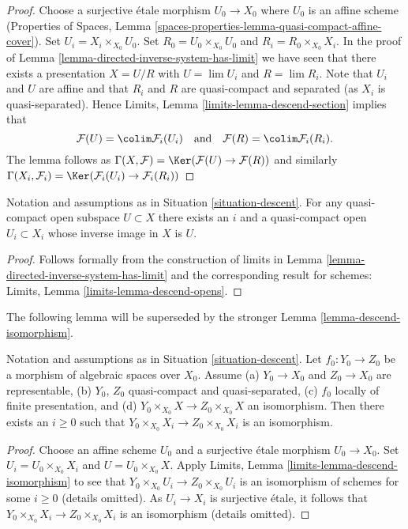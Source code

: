 \begin{proof}
Choose a surjective \'etale morphism $U_0 \to X_0$ where $U_0$ is an affine
scheme (Properties of Spaces, Lemma
\ref{spaces-properties-lemma-quasi-compact-affine-cover}).
Set $U_i = X_i \times_{X_0} U_0$.
Set $R_0 = U_0 \times_{X_0} U_0$ and $R_i = R_0 \times_{X_0} X_i$.
In the proof of Lemma \ref{lemma-directed-inverse-system-has-limit} we have
seen that there exists a presentation $X = U/R$ with
$U = \lim U_i$ and $R = \lim R_i$.
Note that $U_i$ and $U$ are affine and that $R_i$ and $R$ are
quasi-compact and separated (as $X_i$ is quasi-separated). Hence
Limits, Lemma \ref{limits-lemma-descend-section}
implies that
$$
\mathcal{F}(U) = \colim \mathcal{F}_i(U_i)
\quad\text{and}\quad
\mathcal{F}(R) = \colim \mathcal{F}_i(R_i).
$$
The lemma follows as
$\Gamma(X, \mathcal{F}) = \Ker(\mathcal{F}(U) \to \mathcal{F}(R))$
and similarly
$\Gamma(X_i, \mathcal{F}_i) =
\Ker(\mathcal{F}_i(U_i) \to \mathcal{F}_i(R_i))$
\end{proof}

\begin{lemma}
\label{lemma-descend-opens}
Notation and assumptions as in Situation \ref{situation-descent}.
For any quasi-compact open subspace $U \subset X$ there exists an $i$
and a quasi-compact open $U_i \subset X_i$ whose inverse image in $X$ is $U$.
\end{lemma}

\begin{proof}
Follows formally from the construction of limits in
Lemma \ref{lemma-directed-inverse-system-has-limit}
and the corresponding result for schemes:
Limits, Lemma \ref{limits-lemma-descend-opens}.
\end{proof}

\noindent
The following lemma will be superseded by the stronger
Lemma \ref{lemma-descend-isomorphism}.

\begin{lemma}
\label{lemma-descend-equality}
Notation and assumptions as in Situation \ref{situation-descent}.
Let $f_0 : Y_0 \to Z_0$ be a morphism of algebraic spaces over $X_0$.
Assume (a) $Y_0 \to X_0$ and $Z_0 \to X_0$ are representable, (b)
$Y_0$, $Z_0$ quasi-compact and quasi-separated, (c)
$f_0$ locally of finite presentation, and
(d) $Y_0 \times_{X_0} X \to Z_0 \times_{X_0} X$ an isomorphism.
Then there exists an $i \geq 0$ such that
$Y_0 \times_{X_0} X_i \to Z_0 \times_{X_0} X_i$ is an isomorphism.
\end{lemma}

\begin{proof}
Choose an affine scheme $U_0$ and a surjective \'etale morphism $U_0 \to X_0$.
Set $U_i = U_0 \times_{X_0} X_i$ and $U = U_0 \times_{X_0} X$.
Apply Limits, Lemma \ref{limits-lemma-descend-isomorphism}
to see that $Y_0 \times_{X_0} U_i \to Z_0 \times_{X_0} U_i$
is an isomorphism of schemes for some $i \geq 0$ (details omitted).
As $U_i \to X_i$ is surjective \'etale, it follows that
$Y_0 \times_{X_0} X_i \to Z_0 \times_{X_0} X_i$ is an isomorphism
(details omitted).
\end{proof}

